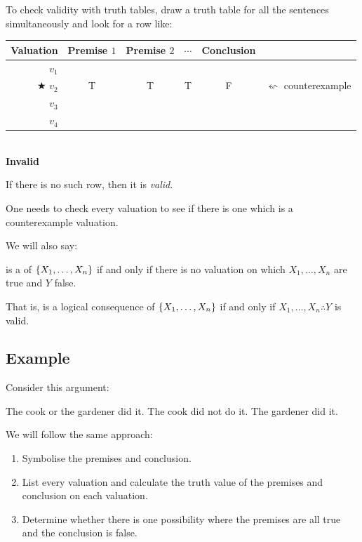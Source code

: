 	
\begin{highlighted}
To check {validity} with truth tables, draw a truth table for all the sentences simultaneously and look for a row like:

\begin{center}
	\begin{tabular}{r || c |c |c || c c}
		Valuation & Premise $1$ & Premise $2$ & $\cdots$ & Conclusion\\
		\hline
		$v_1$&&&&\\
		$\bigstar$ $v_2$  & T & T & T & {F} &$\leftsquigarrow$ counterexample\\
		$v_3$&&&&\\
		$v_4$&&&&
	\end{tabular}\\ \textbf{Invalid}
\end{center}
%	


If there is no such row, then it is \emph{valid}. 
\end{highlighted}


One needs to check every valuation to see if there is one which is a counterexample valuation.


We will also say:
\begin{definition}
\metaY is a  of $\{X_1,\ldots,X_n\}$ if and only if there is no valuation on which $X_1,\ldots,X_n$ are true and $Y$ false. 
\end{definition}
That is, \metaY is a {logical consequence} of $\{X_1,\ldots,X_n\}$ if and only if $X_1,\ldots,X_n\therefore Y$ is valid. 

	
\subsection{Example}

Consider this argument: 
\begin{earg}
	\prem The cook or the gardener did it.
	\prem The cook did not do it.
	\conc The gardener did it.
\end{earg}

We will follow the same approach:
\begin{enumerate}
	\item Symbolise the premises and conclusion.
	\item List every valuation and calculate the truth value of the premises and conclusion on each valuation. 
	\item Determine whether there is one possibility where the premises are all true and the conclusion is false. 
\end{enumerate}

